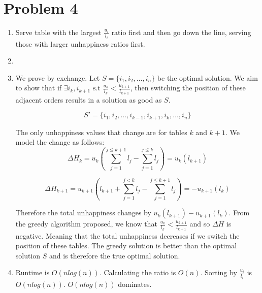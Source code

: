 \documentclass[12pt]{article}
\newcommand{\st}{\text{ s.t }}
\begin{document}
\section*{Problem 4}
\begin{enumerate}
\item[(a)] Serve table with the largest $\frac{u_i}{l_i}$ ratio first and then go down the line, serving those with larger unhappiness ratios first.
\item[] 
\item[(b)] We prove by exchange. Let $S = \{i_1, i_2, \dots, i_n\}$ be the optimal solution. We aim to show that if $\exists i_k, i_{k+1} \st \frac{u_k}{l_k} < \frac{u_{k+1}}{l_{k+1}}$, then switching the position of these adjacent orders results in a solution as good as $S$.

\begin{equation}
  S' = \{i_1, i_2, \dots, i_{k-1}, i_{k+1}, i_k, \dots, i_n\}
\end{equation}

The only unhappiness values that change are for tables $k$ and $k+1$. We model the change as follows:
\begin{equation}
  \Delta H_k = u_k(\sum_{j = 1}^{j \leq k + 1}l_j - \sum_{j = 1}^{j \leq k}l_j) = u_k(l_{k+1})
\end{equation}

\begin{equation}
  \Delta H_{k+1} = u_{k+1}(l_{k+1} + \sum_{j = 1}^{j < k}l_j - \sum_{j = 1}^{j \leq k+1}l_j) = - u_{k+1}(l_k)
\end{equation}

Therefore the total unhappiness changes by $u_k(l_{k+1}) - u_{k+1}(l_k)$. From the greedy algorithm proposed, we know that $\frac{u_k}{l_k} < \frac{u_{k+1}}{l_{k+1}}$ and so $\Delta H$ is negative. Meaning that the total unhappiness decreases if we switch the position of these tables. The greedy solution is better than the optimal solution $S$ and is therefore the true optimal solution.

\item[(c)]Runtime is $O(nlog(n))$. Calculating the ratio is $O(n)$. Sorting by $\frac{u_i}{l_i}$ is $O(nlog(n))$. $O(nlog(n))$ dominates.
\end{enumerate}
\end{document}

